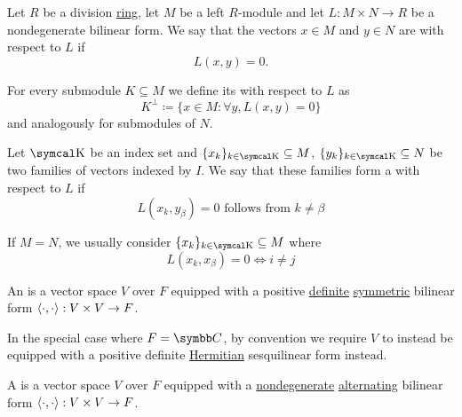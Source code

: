 \begin{definition}\label{def:orthogonality}
  Let \( R \) be a division \hyperref[def:semiring/division_ring]{ring}, let \( M \) be a left \( R \)-module and let \( L: M \times N \to R \) be a nondegenerate bilinear form. We say that the vectors \( x \in M \) and \( y \in N \) are  with respect to \( L \) if
  \begin{equation*}
    L(x, y) = 0.
  \end{equation*}

  For every submodule \( K \subseteq M \) we define its  with respect to \( L \) as
  \begin{equation*}
    K^\perp \coloneqq \{ x \in M \colon \forall y, L(x, y) = 0 \}
  \end{equation*}
  and analogously for submodules of \( N \).

  Let \( \CK \) be an index set and \( \{ x_k \}_{k \in \CK} \subseteq M \), \( \{ y_k \}_{k \in \CK} \subseteq N \) be two families of vectors indexed by \( I \). We say that these families form a  with respect to \( L \) if
  \begin{equation*}
    L(x_k, y_\beta) = 0 \text{ follows from } k \neq \beta
  \end{equation*}

  If \( M = N \), we usually consider  \( \{ x_k \}_{k \in \CK} \subseteq M \) where
  \begin{equation*}
    L(x_k, x_\beta) = 0 \iff i \neq j
  \end{equation*}
\end{definition}

\begin{definition}\label{def:inner_product_space}
  An  is a vector space \( V \) over \( F \) equipped with a positive \hyperref[def:quadratic_form_definiteness]{definite} \hyperref[def:bilinear_form/symmetric]{symmetric} bilinear form \( \left\langle \cdot, \cdot \right\rangle: V \times V \to F \).

  In the special case where \( F = \BC \), by convention we require \( V \) to instead be equipped with a positive definite \hyperref[def:sesquilinear_form/hermitian]{Hermitian} sesquilinear form instead.
\end{definition}

\begin{definition}\label{def:symplectic_vector_space}
  A  is a vector space \( V \) over \( F \) equipped with a \hyperref[def:bilinear_form/symmetric]{nondegenerate}  \hyperref[def:bilinear_form/alternating]{alternating} bilinear form \( \left\langle \cdot, \cdot \right\rangle: V \times V \to F \).
\end{definition}

